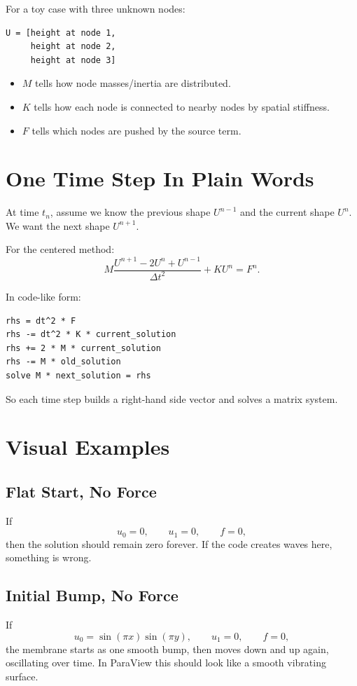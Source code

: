 \documentclass[11pt,a4paper]{article}
\begin{document}
For a toy case with three unknown nodes:
\begin{verbatim}
U = [height at node 1,
     height at node 2,
     height at node 3]
\end{verbatim}

\begin{itemize}
\item \(M\) tells how node masses/inertia are distributed.
\item \(K\) tells how each node is connected to nearby nodes by spatial stiffness.
\item \(F\) tells which nodes are pushed by the source term.
\end{itemize}

\section{One Time Step In Plain Words}
At time \(t_n\), assume we know the previous shape \(U^{n-1}\) and the current shape
\(U^n\). We want the next shape \(U^{n+1}\).

For the centered method:
\[
M\frac{U^{n+1}-2U^n+U^{n-1}}{\Delta t^2}+KU^n=F^n.
\]

In code-like form:
\begin{verbatim}
rhs = dt^2 * F
rhs -= dt^2 * K * current_solution
rhs += 2 * M * current_solution
rhs -= M * old_solution
solve M * next_solution = rhs
\end{verbatim}

So each time step builds a right-hand side vector and solves a matrix system.

\section{Visual Examples}
\subsection*{Flat Start, No Force}
If
\[
u_0=0,\qquad u_1=0,\qquad f=0,
\]
then the solution should remain zero forever. If the code creates waves here,
something is wrong.

\subsection*{Initial Bump, No Force}
If
\[
u_0=\sin(\pi x)\sin(\pi y),\qquad u_1=0,\qquad f=0,
\]
the membrane starts as one smooth bump, then moves down and up again, oscillating over time.
In ParaView this should look like a smooth vibrating surface.
\end{document}
